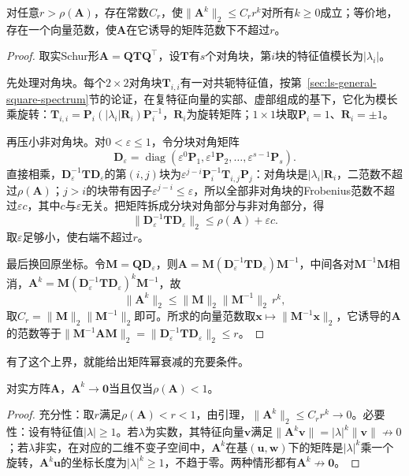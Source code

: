 \begin{lemma}[矩阵幂的几何上界]
\label{lem:ls-power-geometric-bound}
对任意$r>\rho(\bm A)$，存在常数$C_r$，使$\lVert\bm A^k\rVert_2\leq C_rr^k$对所有$k\geq0$成立；等价地，存在一个向量范数，使$\bm A$在它诱导的矩阵范数下不超过$r$。
\end{lemma}
\begin{proof}
取实Schur形$\bm A=\bm Q\bm T\bm Q^\top$，设$\bm T$有$s$个对角块，第$i$块的特征值模长为$|\lambda_i|$。

先处理对角块。每个$2\times2$对角块$\bm T_{i,i}$有一对共轭特征值，按第~\ref{sec:ls-general-square-spectrum}节的论证，在复特征向量的实部、虚部组成的基下，它化为模长乘旋转：$\bm T_{i,i}=\bm P_i(|\lambda_i|\bm R_i)\bm P_i^{-1}$，$\bm R_i$为旋转矩阵；$1\times1$块取$\bm P_i=1$、$\bm R_i=\pm1$。

再压小非对角块。对$0<\varepsilon\leq1$，令分块对角矩阵
\[
 \bm D_\varepsilon=\operatorname{diag}(\varepsilon^{0}\bm P_1,\varepsilon^{1}\bm P_2,\ldots,\varepsilon^{s-1}\bm P_s).
\]
直接相乘，$\bm D_\varepsilon^{-1}\bm T\bm D_\varepsilon$的第$(i,j)$块为$\varepsilon^{j-i}\bm P_i^{-1}\bm T_{i,j}\bm P_j$：对角块是$|\lambda_i|\bm R_i$，二范数不超过$\rho(\bm A)$；$j>i$的块带有因子$\varepsilon^{j-i}\leq\varepsilon$，所以全部非对角块的Frobenius范数不超过$\varepsilon c$，其中$c$与$\varepsilon$无关。把矩阵拆成分块对角部分与非对角部分，得
\[
 \lVert\bm D_\varepsilon^{-1}\bm T\bm D_\varepsilon\rVert_2\leq\rho(\bm A)+\varepsilon c .
\]
取$\varepsilon$足够小，使右端不超过$r$。

最后换回原坐标。令$\bm M=\bm Q\bm D_\varepsilon$，则$\bm A=\bm M(\bm D_\varepsilon^{-1}\bm T\bm D_\varepsilon)\bm M^{-1}$，中间各对$\bm M^{-1}\bm M$相消，$\bm A^k=\bm M(\bm D_\varepsilon^{-1}\bm T\bm D_\varepsilon)^k\bm M^{-1}$，故
\[
 \lVert\bm A^k\rVert_2\leq\lVert\bm M\rVert_2\lVert\bm M^{-1}\rVert_2\,r^k ,
\]
取$C_r=\lVert\bm M\rVert_2\lVert\bm M^{-1}\rVert_2$即可。所求的向量范数取$\bm x\mapsto\lVert\bm M^{-1}\bm x\rVert_2$，它诱导的$\bm A$的范数等于$\lVert\bm M^{-1}\bm A\bm M\rVert_2=\lVert\bm D_\varepsilon^{-1}\bm T\bm D_\varepsilon\rVert_2\leq r$。
\end{proof}

有了这个上界，就能给出矩阵幂衰减的充要条件。
\begin{theorem}[矩阵幂的衰减判据]
\label{thm:ls-power-decay}
对实方阵$\bm A$，$\bm A^k\to\bm0$当且仅当$\rho(\bm A)<1$。
\end{theorem}
\begin{proof}
充分性：取$r$满足$\rho(\bm A)<r<1$，由引理，$\lVert\bm A^k\rVert_2\leq C_rr^k\to0$。必要性：设有特征值$|\lambda|\geq1$。若$\lambda$为实数，其特征向量$\bm v$满足$\lVert\bm A^k\bm v\rVert=|\lambda|^k\lVert\bm v\rVert\not\to0$；若$\lambda$非实，在对应的二维不变子空间中，$\bm A^k$在基$(\bm u,\bm w)$下的矩阵是$|\lambda|^k$乘一个旋转，$\bm A^k\bm u$的坐标长度为$|\lambda|^k\geq1$，不趋于零。两种情形都有$\bm A^k\not\to\bm0$。
\end{proof}

